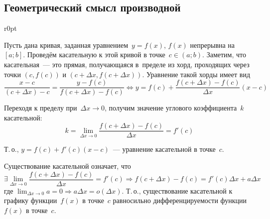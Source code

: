\subsection{Геометрический смысл производной}
\begin{wrapfigure}{r}{0pt}
\noindent
{}
\end{wrapfigure}

Пусть дана кривая, заданная уравнением~$y = f(x)$, $f(x)$ непрерывна на~$[a; b]$.
Проведём касательную к этой кривой в точке~$c \in (a; b)$.
Заметим, что касательная~--- это прямая, получающаяся в~пределе из хорд, проходящих через точки $(c, f(c))$ и $(c + \Delta x, f(c + \Delta x))$.
Уравнение такой хорды имеет вид
\begin{equation*}
\frac{x - c}{(c + \Delta x) - c} = \frac{y - f(c)}{f(c + \Delta x) - f(c)} \Leftrightarrow
y = f(c) + \frac{f(c + \Delta x) - f(c)}{\Delta x} (x - c)
\end{equation*}

Переходя к пределу при~$\Delta x \to 0$, получим значение углового коэффициента~$k$ касательной:
\begin{equation*}
k = \lim_{\Delta x \to 0} \frac{f(c + \Delta x) - f(c)}{\Delta x} = f'(c)
\end{equation*}

Т.\,о., $y = f(c) + f'(c)(x - c)$~--- уравнение касательной в точке~$c$.

Существование касательной означает, что
\begin{equation*}
\displaystyle \exists \lim_{\Delta x \to 0} \frac{f(c + \Delta x) - f(c)}{\Delta x} = f'(c) \Rightarrow
f(c + \Delta x) - f(c) = f'(c) \Delta x + a\Delta x
\end{equation*}
где $\displaystyle \lim_{\Delta x \to 0} a = 0 \Rightarrow a\Delta x = o(\Delta x)$.
Т.\,о., существование касательной к графику функции~$f(x)$ в точке~$c$ равносильно дифференцируемости функции~$f(x)$ в точке~$c$.

